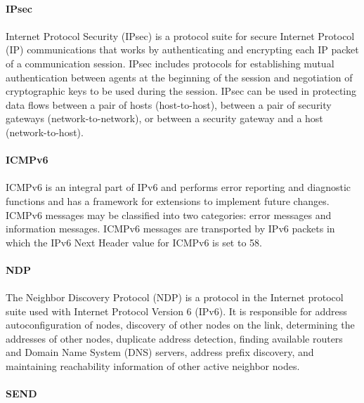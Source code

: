 \paragraph{} \textbf{IPsec}
\paragraph{}
Internet Protocol Security (IPsec) is a protocol suite for secure Internet Protocol (IP) communications that works by authenticating and encrypting each IP packet of a communication session. IPsec includes protocols for establishing mutual authentication between agents at the beginning of the session and negotiation of cryptographic keys to be used during the session. IPsec can be used in protecting data flows between a pair of hosts (host-to-host), between a pair of security gateways (network-to-network), or between a security gateway and a host (network-to-host). 

\paragraph{} \textbf{ICMPv6}
\paragraph{}
ICMPv6 is an integral part of IPv6 and performs error reporting and diagnostic functions and has a framework for extensions to implement future changes. ICMPv6 messages may be classified into two categories: error messages and information messages. ICMPv6 messages are transported by IPv6 packets in which the IPv6 Next Header value for ICMPv6 is set to 58.

\paragraph{} \textbf{NDP}
\paragraph{}
The Neighbor Discovery Protocol (NDP) is a protocol in the Internet protocol suite used with Internet Protocol Version 6 (IPv6). It is responsible for address autoconfiguration of nodes, discovery of other nodes on the link, determining the addresses of other nodes, duplicate address detection, finding available routers and Domain Name System (DNS) servers, address prefix discovery, and maintaining reachability information of other active neighbor nodes.

\paragraph{} \textbf{SEND}
